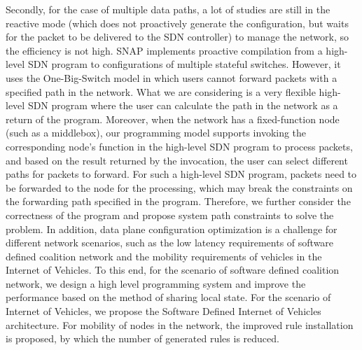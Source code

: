 \documentclass{ctexart}
\begin{document}
Secondly, for the case of multiple data paths, a lot of studies are still in the reactive mode (which does not proactively generate the configuration, but waits for the packet to be delivered to the SDN controller) to manage the network, so the efficiency is not high. SNAP implements proactive compilation from a high-level SDN program to configurations of multiple stateful switches. However, it uses the One-Big-Switch model in which users cannot forward packets with a specified path in the network. What we are considering is a very flexible high-level SDN program where the user can calculate the path in the network as a return of the program. Moreover, when the network has a fixed-function node (such as a middlebox), our programming model supports invoking the corresponding node's function in the high-level SDN program to process packets, and based on the result returned by the invocation, the user can select different paths for packets to forward. For such a high-level SDN program, packets need to be forwarded to the node for the processing, which may break the constraints on the forwarding path specified in the program. Therefore, we further consider the correctness of the program and propose system path constraints to solve the problem. In addition, data plane configuration optimization is a challenge for different network scenarios, such as the low latency requirements of software defined coalition network and the mobility requirements of vehicles in the Internet of Vehicles. To this end, for the scenario of software defined coalition network, we design a high level programming system and improve the performance based on the method of sharing local state. For the scenario of Internet of Vehicles, we propose the Software Defined Internet of Vehicles architecture. For mobility of nodes in the network, the improved rule installation is proposed, by which the number of generated rules is reduced.
\end{document}
